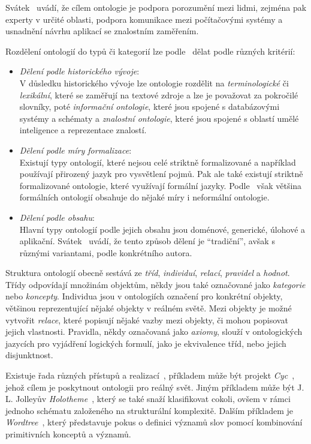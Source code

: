 Svátek~\cite{onto_svatek} uvádí, že cílem ontologie je podpora porozumění mezi lidmi, zejména pak experty v určité oblasti,
podpora komunikace mezi počítačovými systémy a usnadnění návrhu aplikací se znalostním zaměřením.

Rozdělení ontologií do typů či kategorií lze podle~\cite{onto_svatek} dělat podle různých kritérií:
\begin{itemize}
	\item \emph{Dělení podle historického vývoje}:\\
	      V důsledku historického vývoje lze ontologie rozdělit na \emph{terminologické} či \emph{lexikální}, které se zaměřují
	      na textové zdroje a lze je považovat za pokročilé slovníky, poté \emph{informační ontologie}, které jsou spojené s databázovými systémy a schématy
	      a \emph{znalostní ontologie}, které jsou spojené s oblastí umělé inteligence a reprezentace znalostí.
	\item \emph{Dělení podle míry formalizace}:\\
	      Existují typy ontologií, které nejsou celé striktně formalizované a například používají přirozený jazyk pro vysvětlení pojmů.
	      Pak ale také existují striktně formalizované ontologie, které využívají formální jazyky.
	      Podle~\cite{onto_svatek} však většina formálních ontologií obsahuje do nějaké míry i neformální ontologie.
	\item \emph{Dělení podle obsahu}:\\
	      Hlavní typy ontologií podle jejich obsahu jsou doménové, generické, úlohové a aplikační.
	      Svátek~\cite{onto_svatek} uvádí, že tento způsob dělení je \enquote{tradiční}, avšak s různými variantami, podle konkrétního autora.
\end{itemize}

Struktura ontologií obecně sestává ze \emph{tříd}, \emph{individuí}, \emph{relací}, \emph{pravidel} a \emph{hodnot}.
Třídy odpovídají množinám objektům, někdy jsou také označované jako \emph{kategorie} nebo \emph{koncepty}.
Individua jsou v ontologiích označení pro konkrétní objekty, většinou reprezentující nějaké objekty v reálném světě.
Mezi objekty je možné vytvořit \emph{relace}, které popisují nějaké vazby mezi objekty, či mohou popisovat jejich vlastnosti.
Pravidla, někdy označovaná jako \emph{axiomy}, slouží v ontologických jazycích pro vyjádření logických formulí, jako je ekvivalence tříd, nebo jejich disjunktnost.~\cite{onto_svatek}

Existuje řada různých přístupů a realizací~\cite{semantic-nets-LEHMANN19921}, příkladem může být projekt \emph{Cyc}~\cite{cyc}, jehož cílem je poskytnout ontologii pro reálný svět.
Jiným příkladem může být J. L. Jolleyův \emph{Holotheme}~\cite{jolley1971holotheme}, který se také snaží klasifikovat cokoli,
ovšem v rámci jednoho schématu založeného na strukturální komplexitě.
Dalším příkladem je \emph{Wordtree}~\cite{burger1984wordtree}, který představuje pokus o definici významů slov pomocí kombinování primitivních konceptů a významů.

